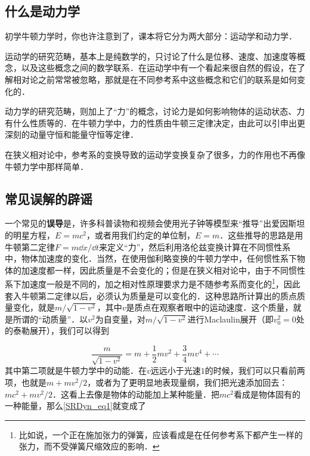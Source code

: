 

\subsection{什么是动力学}
初学牛顿力学时，你也许注意到了，课本将它分为两大部分：运动学和动力学．

运动学的研究范畴，基本上是纯数学的，只讨论了什么是位移、速度、加速度等概念，以及这些概念之间的数学联系．在运动学中有一个看起来很自然的假设，在了解相对论之前常常被忽略，那就是在不同参考系中这些概念和它们的联系是如何变化的．

动力学的研究范畴，则加上了“力”的概念，讨论力是如何影响物体的运动状态、力有什么性质等的．在牛顿力学中，力的性质由牛顿三定律决定，由此可以引申出更深刻的动量守恒和能量守恒等定律．

在狭义相对论中，参考系的变换导致的运动学变换复杂了很多，力的作用也不再像牛顿力学中那样简单．

\subsection{常见误解的辟谣}
一个常见的\textbf{误导}是，许多科普读物和视频会使用光子钟等模型来“推导”出爱因斯坦的明星方程，$E=mc^2$，或者用我们约定的单位制，$E=m$．这些推导的思路是用牛顿第二定律$F=m\dd x/\dd t$来定义“力”，然后利用洛伦兹变换计算在不同惯性系中，物体加速度的变化．当然，在使用伽利略变换的牛顿力学中，任何惯性系下物体的加速度都一样，因此质量是不会变化的；但是在狭义相对论中，由于不同惯性系下加速度一般是不同的，加之相对性原理要求力是不随参考系而变化的\footnote{比如说，一个正在施加张力的弹簧，应该看成是在任何参考系下都产生一样的张力，而不受弹簧尺缩效应的影响．}，因此套入牛顿第二定律以后，必须认为质量是可以变化的．这种思路所计算出的质点质量变化，就是$m/\sqrt{1-v^2}$，其中$v$是质点在观察者眼中的运动速度．这个质量，就是所谓的“动质量”．以$v^2$为自变量，对$m/\sqrt{1-v^2}$进行Maclaulin展开（即$v_0^2=0$处的泰勒展开），我们可以得到

\begin{equation}\label{SRDyn_eq1}
\frac{m}{\sqrt{1-v^2}}=m+\frac{1}{2}mv^2+\frac{3}{4}mv^4+\cdots
\end{equation}
其中第二项就是牛顿力学中的动能．在$v$远远小于光速$1$的时候，我们可以只看前两项，也就是$m+mv^2/2$，或者为了更明显地表现量纲，我们把光速添加回去：$mc^2+mv^2/2$．这看上去像是物体的动能加上某种能量．把$mc^2$看成是物体固有的一种能量，那么\autoref{SRDyn_eq1}就变成了

